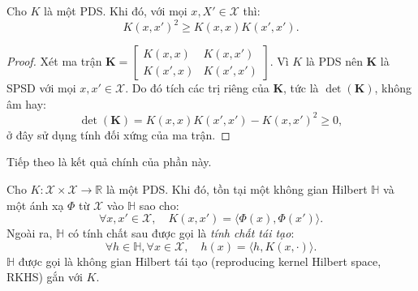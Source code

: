 \begin{lem}
  \label{lem:c-s-ineq-pds-ker}
  Cho $K$ là một  PDS. Khi đó, với mọi $x, X'\in \mathcal{X}$ thì:
  \begin{equation}
    K(x, x')^2\ge K(x, x)K(x',x').
  \end{equation}
\end{lem}

\begin{proof}
  Xét ma trận $\mathbf{K} = \begin{bmatrix} K(x, x) & K(x, x') \\ K(x', x) &
  K(x', x') \end{bmatrix}$. Vì $K$ là  PDS nên $\mathbf{K}$ là
  SPSD với mọi $x, x' \in \mathcal{X}$. Do đó tích các trị riêng của
  $\mathbf{K}$, tức là $\det(\mathbf{K})$, không âm hay: \begin{equation}
    \det(\mathbf{K}) = K(x, x)K(x', x') - K(x, x')^2 \ge 0,
  \end{equation}ở đây sử dụng tính đối xứng của ma trận.
\end{proof}

Tiếp theo là kết quả chính của phần này.

\begin{thm}
  \label{thm:rkhs}
  Cho $K\colon \mathcal{X} \times \mathcal{X} \to \mathbb{R}$ là một
   PDS. Khi đó, tồn tại một không gian Hilbert $\mathbb{H}$ và một
  ánh xạ $\Phi$ từ $\mathcal{X}$ vào $\mathbb{H}$ sao cho: \begin{equation}
    \forall x, x' \in \mathcal{X}, \quad K(x, x') = \bigl\langle \Phi(x), \Phi(x')
    \bigr\rangle.
  \end{equation} Ngoài ra, $\mathbb{H}$ có tính chất sau được gọi là \emph{tính
  chất tái tạo}: \begin{equation}
    \forall h \in \mathbb{H},\forall x \in \mathcal{X}, \quad h(x) =
    \bigl\langle h, K(x,\cdot) \bigr\rangle.
  \end{equation} $\mathbb{H}$ được gọi là không gian Hilbert  tái
  tạo (reproducing kernel Hilbert space, RKHS) gắn với $K$.
\end{thm}

